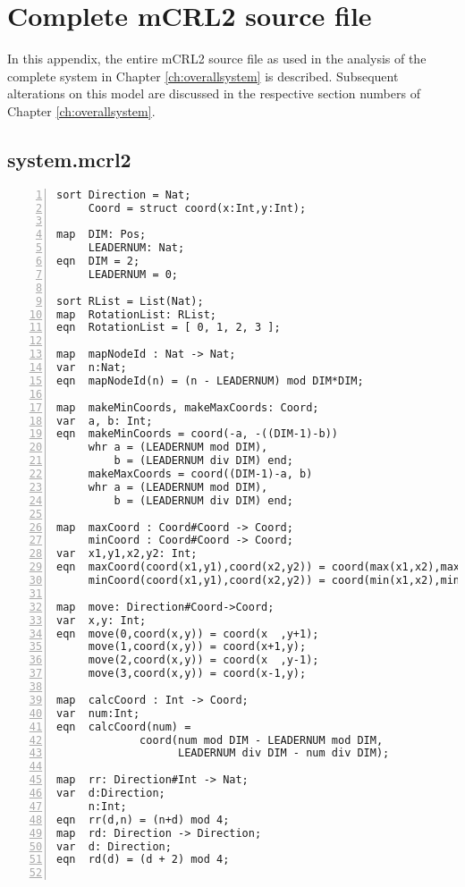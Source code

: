 \chapter{Complete mCRL2 source file}
\label{apx:source}

In this appendix, the entire mCRL2 source file as used in the analysis of the complete system in Chapter \ref{ch:overallsystem} is described. Subsequent alterations on this model are discussed in the respective section numbers of Chapter \ref{ch:overallsystem}.

\section*{system.mcrl2}

\begin{Verbatim}[frame=lines,numbers=left,fontfamily=courier,fontsize=\footnotesize]
sort Direction = Nat;
     Coord = struct coord(x:Int,y:Int);

map  DIM: Pos;
     LEADERNUM: Nat;
eqn  DIM = 2;
     LEADERNUM = 0;

sort RList = List(Nat);
map  RotationList: RList;
eqn  RotationList = [ 0, 1, 2, 3 ];

map  mapNodeId : Nat -> Nat;
var  n:Nat;
eqn  mapNodeId(n) = (n - LEADERNUM) mod DIM*DIM;

map  makeMinCoords, makeMaxCoords: Coord;
var  a, b: Int;
eqn  makeMinCoords = coord(-a, -((DIM-1)-b))
     whr a = (LEADERNUM mod DIM),
         b = (LEADERNUM div DIM) end;
     makeMaxCoords = coord((DIM-1)-a, b)
     whr a = (LEADERNUM mod DIM),
         b = (LEADERNUM div DIM) end;

map  maxCoord : Coord#Coord -> Coord;
     minCoord : Coord#Coord -> Coord;
var  x1,y1,x2,y2: Int;
eqn  maxCoord(coord(x1,y1),coord(x2,y2)) = coord(max(x1,x2),max(y1,y2));
     minCoord(coord(x1,y1),coord(x2,y2)) = coord(min(x1,x2),min(y1,y2));

map  move: Direction#Coord->Coord;
var  x,y: Int;
eqn  move(0,coord(x,y)) = coord(x  ,y+1);
     move(1,coord(x,y)) = coord(x+1,y);
     move(2,coord(x,y)) = coord(x  ,y-1);
     move(3,coord(x,y)) = coord(x-1,y);

map  calcCoord : Int -> Coord;
var  num:Int;
eqn  calcCoord(num) =
             coord(num mod DIM - LEADERNUM mod DIM,
                   LEADERNUM div DIM - num div DIM);

map  rr: Direction#Int -> Nat;
var  d:Direction;
     n:Int;
eqn  rr(d,n) = (n+d) mod 4;
map  rd: Direction -> Direction;
var  d: Direction;
eqn  rd(d) = (d + 2) mod 4;


\end{Verbatim}
